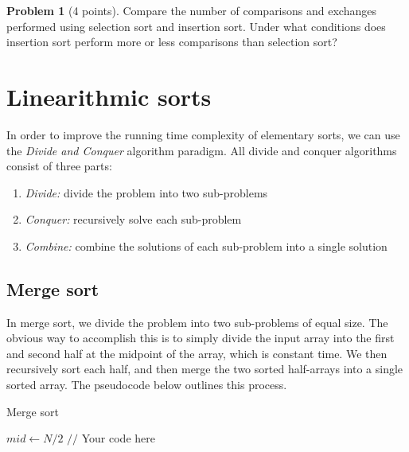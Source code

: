 \documentclass{exam}
\theoremstyle{definition}
\newtheorem{problem}{Problem}[section]
\theoremstyle{definition}
\begin{document}
\begin{problem}[4 points]
    Compare the number of comparisons and exchanges performed using selection sort and insertion sort. Under what conditions does insertion sort perform more or less comparisons than selection sort?
\end{problem}



\section{Linearithmic sorts}

In order to improve the running time complexity of elementary sorts, we can use the \textit{Divide and Conquer} algorithm paradigm. All divide and conquer algorithms consist of three parts: 

\begin{enumerate}
    \item \textit{Divide:} divide the problem into two sub-problems
    \item \textit{Conquer:} recursively solve each sub-problem
    \item \textit{Combine:} combine the solutions of each sub-problem into a single solution
\end{enumerate}



\subsection{Merge sort}

In merge sort, we divide the problem into two sub-problems of equal size. The obvious way to accomplish this is to simply divide the input array into the first and second half at the midpoint of the array, which is constant time. We then recursively sort each half, and then merge the two sorted half-arrays into a single sorted array. The pseudocode below outlines this process. 

\begin{algorithm}[H]
\caption{Merge sort}
\begin{algorithmic}
    \State $ mid \gets N/2$
    \State {}
    \State {}
    \State \Return {}
\EndFunction
{}
    \State $//$ Your code here 
\EndFunction
\end{algorithmic}
\end{algorithm}
\end{document}
